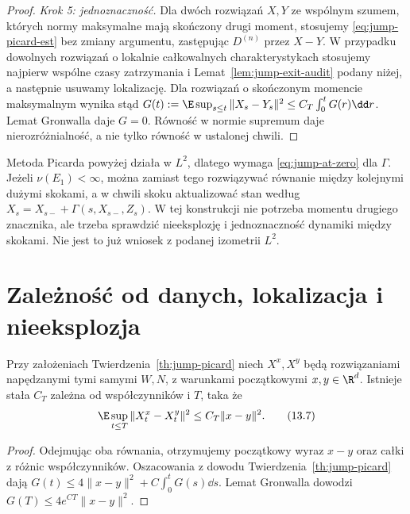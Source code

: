 \begin{proof}
\emph{Krok 5: jednoznaczność.} Dla dwóch rozwiązań $X,Y$
ze wspólnym szumem, których normy maksymalne mają skończony
drugi moment, stosujemy \eqref{eq:jump-picard-est}
bez zmiany argumentu, zastępując $D^{(n)}$ przez $X-Y$.
W przypadku dowolnych rozwiązań o lokalnie całkowalnych
charakterystykach stosujemy najpierw wspólne czasy
zatrzymania i Lemat~\ref{lem:jump-exit-audit} podany niżej,
a następnie usuwamy lokalizację. Dla rozwiązań o
skończonym momencie maksymalnym wynika stąd
$G(t):=\E\sup_{s\le t}\|X_s-Y_s\|^2
\le C_T\int_0^tG(r)\dd r$.
Lemat Gronwalla daje $G=0$. Równość w normie supremum
daje nierozróżnialność, a nie tylko równość w ustalonej
chwili.
\end{proof}

\begin{uwaga}
Metoda Picarda powyżej działa w $L^2$, dlatego wymaga
\eqref{eq:jump-at-zero} dla $\Gamma$. Jeżeli $\nu(E_1)<\infty$,
można zamiast tego rozwiązywać równanie między kolejnymi dużymi
skokami, a w chwili skoku aktualizować stan według
$X_s=X_{s-}+\Gamma(s,X_{s-},Z_s)$. W tej konstrukcji
nie potrzeba momentu drugiego znacznika, ale trzeba
sprawdzić nieeksplozję i jednoznaczność dynamiki między
skokami. Nie jest to już wniosek z podanej izometrii $L^2$.
\end{uwaga}

\section{Zależność od danych, lokalizacja i nieeksplozja}

\begin{twierdzenie}
\label{th:jump-stability}
Przy założeniach Twierdzenia~\ref{th:jump-picard} niech
$X^x,X^y$ będą rozwiązaniami napędzanymi tymi samymi
$W,N$, z warunkami początkowymi $x,y\in\R^d$.
Istnieje stała $C_T$ zależna od współczynników i $T$, taka że
\[
 \E\sup_{t\le T}\|X_t^x-X_t^y\|^2\le C_T\|x-y\|^2.
 \tag{13.7}\label{eq:jump-stability}
\]
\end{twierdzenie}
\begin{proof}
Odejmując oba równania, otrzymujemy początkowy wyraz
$x-y$ oraz całki z różnic współczynników. Oszacowania
z dowodu Twierdzenia~\ref{th:jump-picard} dają
$G(t)\le4\|x-y\|^2+C\int_0^tG(s)\dd s$.
Lemat Gronwalla dowodzi $G(T)\le4e^{CT}\|x-y\|^2$.
\end{proof}

